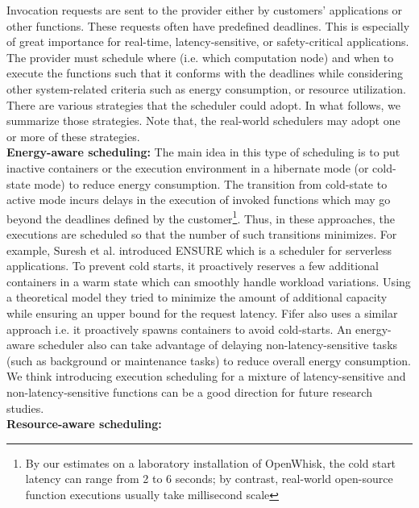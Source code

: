 \label{sec:scheduling}
Invocation requests are sent to the provider either by customers' applications or other functions. These requests often have predefined deadlines. This is especially of great importance for real-time, latency-sensitive, or safety-critical applications. The provider must schedule where (i.e. which computation node) and when to execute the functions such that it conforms with the deadlines while considering other system-related criteria such as energy consumption, or resource utilization. There are various strategies that the scheduler could adopt. In what follows, we summarize those strategies. Note that, the real-world schedulers may adopt one or more of these strategies.
\\
\noindent \textbf{Energy-aware scheduling:}
The main idea in this type of scheduling is to put inactive containers or the execution environment in a hibernate mode (or cold-state mode) to reduce energy consumption. The transition from cold-state to active mode incurs delays in the execution of invoked functions which may go beyond the deadlines defined by the customer\footnote{By our estimates on a laboratory installation of OpenWhisk, the cold start latency can range from 2 to 6 seconds; by contrast, real-world open-source function executions usually take millisecond scale}. Thus, in these approaches, the executions are scheduled so that the number of such transitions minimizes. For example, Suresh et al.  introduced ENSURE which is a scheduler for serverless applications. To prevent cold starts, it proactively reserves a few additional containers in a warm state which can smoothly handle workload variations. Using a theoretical model they tried to minimize the amount of additional capacity while ensuring an upper bound for the request latency. Fifer  also uses a similar approach i.e. it proactively spawns containers to avoid cold-starts.
An energy-aware scheduler also can take advantage of delaying non-latency-sensitive tasks (such as background or maintenance tasks) to reduce overall energy consumption. We think introducing execution scheduling for a mixture of latency-sensitive and non-latency-sensitive functions can be a good direction for future research studies.
\\
\noindent \textbf{Resource-aware scheduling:}
